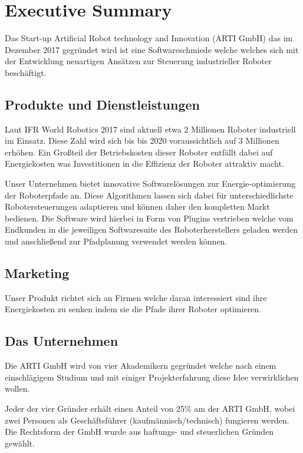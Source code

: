 \chapter{Executive Summary}

Das Start-up Artificial Robot technology and Innovation (ARTI GmbH) das im Dezember 2017 gegründet wird ist eine Softwareschmiede welche welches sich mit der Entwicklung neuartigen Ansätzen zur Steuerung industrieller Roboter beschäftigt.

\section{Produkte und Dienstleistungen}

Laut IFR World Robotics 2017 sind aktuell etwa 2 Millionen Roboter industriell im Einsatz. Diese Zahl wird sich bis bis 2020 voraussichtlich auf 3 Millionen erhöhen. Ein Großteil der Betriebskosten dieser Roboter entfällt dabei auf Energiekosten was Investitionen in die Effizienz der Roboter attraktiv macht.

Unser Unternehmen bietet innovative Softwarelösungen zur Energie-optimierung der Roboterpfade an. Diese Algorithmen lassen sich dabei für unterschiedlichste Robotersteuerungen adaptieren und können daher den kompletten Markt bedienen. Die Software wird hierbei in Form von Plugins vertrieben welche vom Endkunden in die jeweiligen Softwaresuite des Roboterherstellers geladen werden und anschließend zur Pfadplanung verwendet werden können.

\section{Marketing}

Unser Produkt richtet sich an Firmen welche daran interessiert sind ihre Energiekosten zu senken indem sie die Pfade ihrer Roboter optimieren.

\section{Das Unternehmen}

Die ARTI GmbH wird von vier Akademikern gegründet welche nach einem einschlägigem Studium und mit einiger Projekterfahrung diese Idee verwirklichen wollen.

Jeder der vier Gründer erhält einen Anteil von 25\% am der ARTI GmbH, wobei zwei Personen als Geschäftsführer (kaufmännisch/technisch) fungieren werden. Die Rechtsform der GmbH wurde aus haftungs- und steuerlichen Gründen gewählt.

